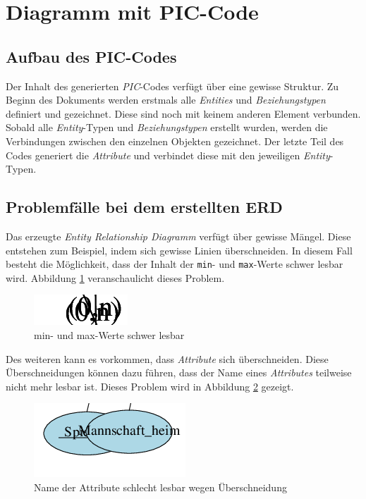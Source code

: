 \section{Diagramm mit PIC-Code}
\pra
\subsection{Aufbau des PIC-Codes}
\noindent
Der Inhalt des generierten \textit{PIC}-Codes verfügt über eine gewisse Struktur. Zu Beginn des Dokuments werden erstmals alle \textit{Entities} und \textit{Beziehungstypen} definiert und gezeichnet. Diese sind noch mit keinem anderen Element verbunden. Sobald alle \textit{Entity}-Typen und \textit{Beziehungstypen} erstellt wurden, werden die Verbindungen zwischen den einzelnen Objekten gezeichnet. Der letzte Teil des Codes generiert die \textit{Attribute} und verbindet diese mit den jeweiligen \textit{Entity}-Typen. 
\\

\subsection{Problemfälle bei dem erstellten ERD}
\noindent
Das erzeugte \textit{Entity Relationship Diagramm} verfügt über gewisse Mängel. Diese entstehen zum Beispiel, indem sich gewisse Linien überschneiden. In diesem Fall besteht die Möglichkeit, dass der Inhalt der \verb|min|- und \verb|max|-Werte schwer lesbar wird. Abbildung \ref{Ueberschneidung} veranschaulicht dieses Problem.
\\


\begin{figure}[H]
	\begin{center}
		\includegraphics{images/Ueberschneidung.png}
		\caption{min- und max-Werte schwer lesbar}
		\label{Ueberschneidung}
	\end{center}
\end{figure}
\pra
\noindent
Des weiteren kann es vorkommen, dass \textit{Attribute} sich überschneiden. Diese Überschneidungen können dazu führen, dass der Name eines \textit{Attributes} teilweise nicht mehr lesbar ist. Dieses Problem wird in Abbildung \ref{Attr_ueber} gezeigt.
\\

\begin{figure}[H]
	\begin{center}
		\includegraphics{images/Attr_ueber.png}
		\caption{Name der Attribute schlecht lesbar wegen Überschneidung}
		\label{Attr_ueber}
	\end{center}
\end{figure}

